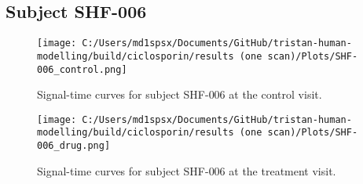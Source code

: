 \documentclass{epflreport}%
\begin{document}
\subsection{Subject SHF{-}006}%
\label{subsec:SubjectSHF{-}006}%

%


\begin{figure}[h!]%
\centering%
\texttt{[image: C:/Users/md1spsx/Documents/GitHub/tristan-human-modelling/build/ciclosporin/results (one scan)/Plots/SHF-006\_control.png]}%
\caption{Signal{-}time curves for subject SHF{-}006 at the control visit.}%
\end{figure}

%


\begin{figure}[h!]%
\centering%
\texttt{[image: C:/Users/md1spsx/Documents/GitHub/tristan-human-modelling/build/ciclosporin/results (one scan)/Plots/SHF-006\_drug.png]}%
\caption{Signal{-}time curves for subject SHF{-}006 at the treatment visit.}%
\end{figure}
\end{document}
